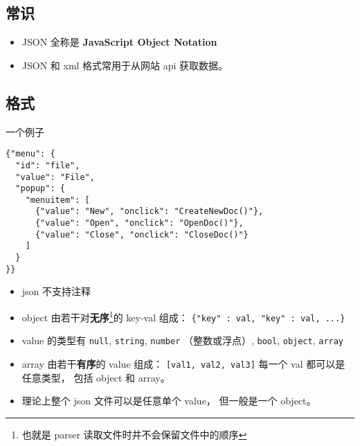 
\begin{issues}
\issueDraft
\end{issues}

\subsection{常识}
\begin{itemize}
\item JSON 全称是 \textbf{JavaScript Object Notation}
\item JSON 和 xml 格式常用于从网站 api 获取数据。
\end{itemize}

\subsection{格式}
一个例子
\begin{lstlisting}[language=none]
{"menu": {
  "id": "file",
  "value": "File",
  "popup": {
    "menuitem": [
      {"value": "New", "onclick": "CreateNewDoc()"},
      {"value": "Open", "onclick": "OpenDoc()"},
      {"value": "Close", "onclick": "CloseDoc()"}
    ]
  }
}}
\end{lstlisting}

\begin{itemize}
\item json 不支持注释
\item object 由若干对\textbf{无序}\footnote{也就是 parser 读取文件时并不会保留文件中的顺序}的 key-val 组成： \verb|{"key" : val, "key" : val, ...}|
\item value 的类型有 \verb|null|, \verb|string|, \verb|number| （整数或浮点）, \verb|bool|, \verb|object|, \verb|array|
\item array 由若干\textbf{有序}的 value 组成： \verb|[val1, val2, val3]| 每一个 val 都可以是任意类型， 包括 object 和 array。
\item 理论上整个 json 文件可以是任意单个 value， 但一般是一个 object。
\end{itemize}
